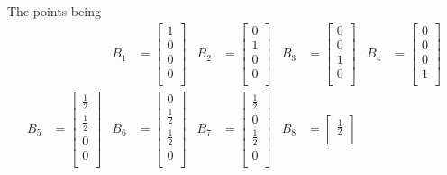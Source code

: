 \documentclass{mitschrift}
\begin{document}
The points being \begin{align}
    && B_1 &= \begin{bmatrix}
        1 \\
        0 \\
        0 \\
        0 \\
    \end{bmatrix} & B_2 &= \begin{bmatrix}
        0 \\
        1 \\
        0 \\
        0 \\
    \end{bmatrix} & B_3 &= \begin{bmatrix}
        0 \\
        0 \\
        1 \\
        0 \\
    \end{bmatrix} & B_4 &= \begin{bmatrix}
        0 \\
        0 \\
        0 \\
        1 \\
    \end{bmatrix} \\
    B_5 &= \begin{bmatrix}
        \frac{1}{2} \\
        \frac{1}{2} \\
        0 \\
        0 \\
    \end{bmatrix} & B_6 &= \begin{bmatrix}
        0 \\
        \frac{1}{2} \\
        \frac{1}{2} \\
        0 \\
    \end{bmatrix} & B_7 &= \begin{bmatrix}
        \frac{1}{2} \\
        0 \\
        \frac{1}{2} \\
        0 \\
    \end{bmatrix} & B_8 &= \begin{bmatrix}
        \frac{1}{2} \\

\end{bmatrix}
\end{align}
\end{document}
